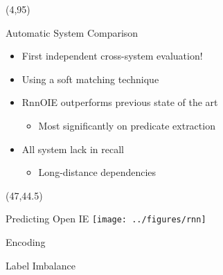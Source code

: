 \documentclass[final]{beamer}
\newcommand{\commonvspace}[0]{\vspace{1cm}}
\begin{document}
\begin{frame}{}
\begin{textblock}{39}
\end{textblock}

\begin{textblock}{82}(4,95)

\begin{block}{Automatic System Comparison}
  \noindent
  \begin{minipage}{.35\textwidth}
  \begin{itemize}
    \setlength\itemsep{1em}
  \item \alert{First independent cross-system evaluation!}
  \item Using a soft matching technique
  \item RnnOIE outperforms previous state of the art
    \begin{itemize}
    \item Most significantly on \alert{predicate extraction}
    \end{itemize}
  \item All system lack in recall
    \begin{itemize}
      \item Long-distance dependencies
    \end{itemize}
  \end{itemize}
  \end{minipage}%
  \begin{minipage}{.65\textwidth}
%    
    \end{minipage}
\end{block}

\end{textblock}



\begin{textblock}{39}(47,44.5) 
  \begin{block}{Predicting Open IE}
    \center
\texttt{[image: ../figures/rnn]}
  \end{block}
  \commonvspace

  \begin{block}{Encoding}
    \vspace{-2cm}
    
  \end{block}
  \commonvspace

  \begin{block}{Label Imbalance}
    


\end{block}
\end{textblock}
\end{frame}
\end{document}
